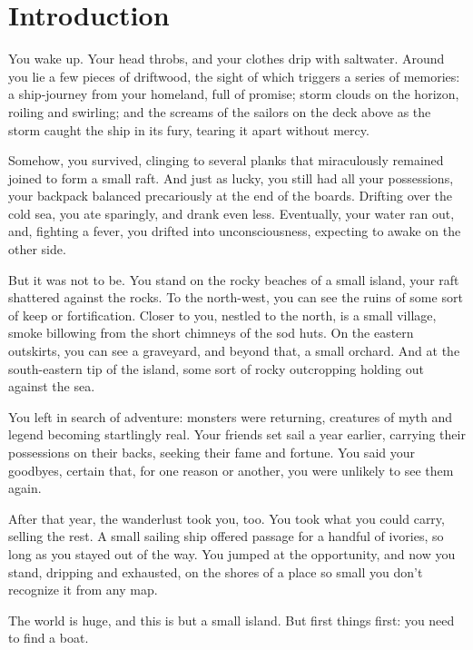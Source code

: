 \section{Introduction}

You wake up.  Your head throbs, and your clothes drip with saltwater. 
Around you lie a few pieces of driftwood, the sight of which triggers
a series of memories: a ship-journey from your homeland, full of promise;
storm clouds on the horizon, roiling and swirling; and the screams of the
sailors on the deck above as the storm caught the ship in its fury, tearing
it apart without mercy.

Somehow, you survived, clinging to several planks that miraculously
remained joined to form a small raft. And just as lucky, you still had all
your possessions, your backpack balanced precariously at the end of the
boards.  Drifting over the cold sea, you ate sparingly, and drank even
less.  Eventually, your water ran out, and, fighting a fever, you drifted
into unconsciousness, expecting to awake on the other side.

But it was not to be.  You stand on the rocky beaches of a small island,
your raft shattered against the rocks.  To the north-west, you can see the 
ruins of some sort of keep or fortification.  Closer to you, nestled to the
north, is a small village, smoke billowing from the short chimneys of the 
sod huts.  On the eastern outskirts, you can see a graveyard, and beyond 
that, a small orchard.  And at the south-eastern tip of the island, some 
sort of rocky outcropping holding out against the sea.
 
You left in search of adventure: monsters were returning, creatures of myth
and legend becoming startlingly real.  Your friends set sail a year
earlier, carrying their possessions on their backs, seeking their fame and
fortune.  You said your goodbyes, certain that, for one reason or another,
you were unlikely to see them again.

After that year, the wanderlust took you, too.  You took what you could
carry, selling the rest.  A small sailing ship offered passage for a 
handful of ivories, so long as you stayed out of the way.  You
jumped at the opportunity, and now you stand, dripping and exhausted, on the
shores of a place so small you don't recognize it from any map.

The world is huge, and this is but a small island.  But first things first:
you need to find a boat.

